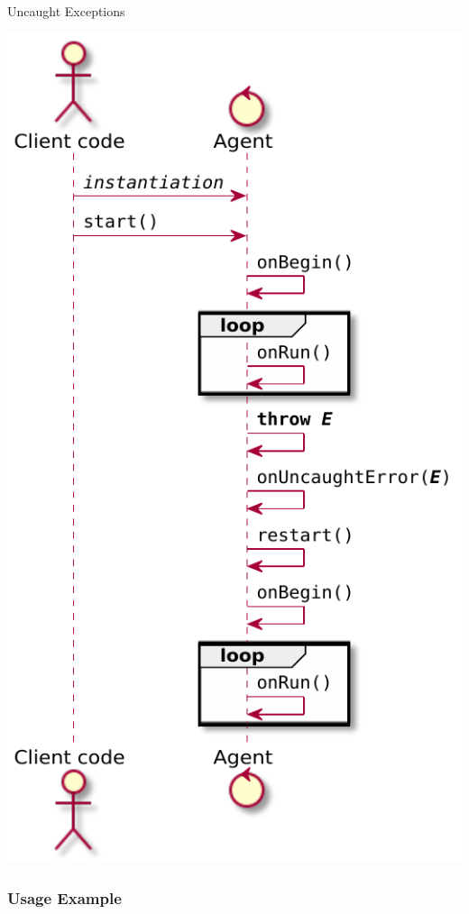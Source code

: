 \documentclass[presentation]{beamer}\mode<presentation>{\usetheme{AMSCesenaPurpleAndGold}}
\begin{document}
\begin{frame}[allowframebreaks]{Uncaught Exceptions}
    \begin{center}
    	\includegraphics[height=.8\textheight]{img/exceptional-flow-3.pdf}
    \end{center}
\end{frame}

\subsubsection{Usage Example}
\end{document}
